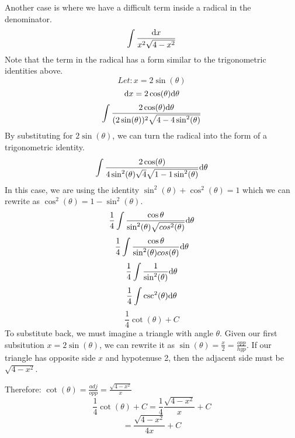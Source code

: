 \documentclass[letterpaper, 12pt]{math}
\begin{document}
Another case is where we have a difficult term inside a radical in the
denominator.
\[ \int{\frac{\mathrm{d}{x}}{x^{2}\sqrt{4-x^{2}}}} \]
Note that the term in the radical has a form similar to the trigonometric
identities above.
\[ Let: x = 2\sin(\theta) \]
\[ \mathrm{d}{x} = 2\cos(\theta)\mathrm{d}{\theta} \]
\[ \int{\frac{2\cos(\theta)\mathrm{d}{\theta}}
   {(2\sin(\theta))^{2}\sqrt{4-4\sin^{2}(\theta)}}} \]
By substituting for \( 2\sin(\theta) \), we can turn the radical into the form
of a trigonometric identity.
\[ \int{\frac{2\cos(\theta)}
  {4\sin^{2}(\theta)\sqrt{4}\sqrt{1-1\sin^{2}(\theta)}}\mathrm{d}{\theta}} \]
In this case, we are using the identity
\( \sin^{2}(\theta)+\cos^{2}(\theta) = 1 \) which we can rewrite as
\( \cos^{2}(\theta) = 1-\sin^{2}(\theta) \).
\[ \frac{1}{4}\int{\frac{\cos{\theta}}
   {\sin^{2}(\theta)\sqrt{cos^{2}(\theta)}}\mathrm{d}{\theta}} \]
\[ \frac{1}{4}\int{\frac{\cos{\theta}}
    {\sin^{2}(\theta)cos(\theta)}\mathrm{d}{\theta}} \]
\[ \frac{1}{4}\int{\frac{1}{\sin^{2}(\theta)}\mathrm{d}{\theta}} \]
\[ \frac{1}{4}\int{\csc^{2}(\theta)\mathrm{d}{\theta}} \]
\[ \frac{1}{4}\cot(\theta)+C \]
To substitute back, we must imagine a triangle with angle \( \theta \). Given
our first subsitution \( x = 2\sin(\theta) \), we can rewrite it as
\( \sin(\theta) = \frac{x}{2} = \frac{opp}{hyp} \). If our triangle has opposite
side \( x \) and hypotenuse 2, then the adjacent side must be
\( \sqrt{4-x^{2}} \).
\begin{center}
\end{center}
Therefore: \( \cot(\theta) = \frac{adj}{opp} = \frac{\sqrt{4-x^{2}}}{x} \)
\[ \frac{1}{4}\cot(\theta)+C = \frac{1}{4}\frac{\sqrt{4-x^{2}}}{x}+C \]
\[ = \frac{\sqrt{4-x^{2}}}{4x}+C \]
\end{document}
